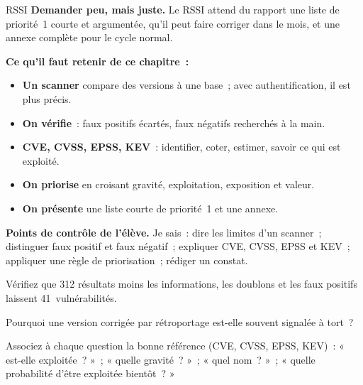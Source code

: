 \begin{boxmetier}{RSSI}
\textbf{Demander peu, mais juste.} Le RSSI attend du rapport une liste de
priorité~1 courte et argumentée, qu'il peut faire corriger dans le mois, et
une annexe complète pour le cycle normal.
\end{boxmetier}

\separateur

\begin{boxresume}
\textbf{Ce qu'il faut retenir de ce chapitre~:}
\begin{itemize}
    \item \textbf{Un scanner} compare des versions à une base~; avec
          authentification, il est plus précis.
    \item \textbf{On vérifie}~: faux positifs écartés, faux négatifs
          recherchés à la main.
    \item \textbf{CVE, CVSS, EPSS, KEV}~: identifier, coter, estimer,
          savoir ce qui est exploité.
    \item \textbf{On priorise} en croisant gravité, exploitation, exposition
          et valeur.
    \item \textbf{On présente} une liste courte de priorité~1 et une annexe.
\end{itemize}
\end{boxresume}

\begin{boxinfo}
\textbf{Points de contrôle de l'élève.} Je sais~: dire les limites d'un
scanner~; distinguer faux positif et faux négatif~; expliquer CVE, CVSS,
EPSS et KEV~; appliquer une règle de priorisation~; rédiger un constat.
\end{boxinfo}

\bigskip

\begin{boxexo}[title={\ding{45}\quad Exercice~7.1. Les chiffres \niveaubase}]
Vérifiez que 312 résultats moins les informations, les doublons et les faux
positifs laissent 41~vulnérabilités.
\end{boxexo}

\begin{boxexo}[title={\ding{45}\quad Exercice~7.2. Faux positif \niveaubase}]
Pourquoi une version corrigée par rétroportage est-elle souvent signalée à
tort~?
\end{boxexo}

\begin{boxexo}[title={\ding{45}\quad Exercice~7.3. Les références \niveaubase}]
Associez à chaque question la bonne référence (CVE, CVSS, EPSS, KEV)~:
« est-elle exploitée~? »~; « quelle gravité~? »~; « quel nom~? »~; « quelle
probabilité d'être exploitée bientôt~? »
\end{boxexo}

